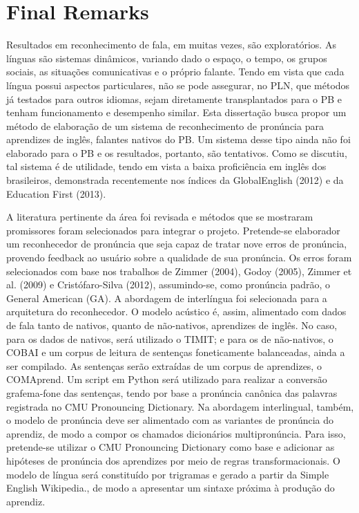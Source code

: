 \chapter{Final Remarks}\label{ch:final-remarks}


Resultados em reconhecimento de fala, em muitas vezes, s\~ao
explorat\'orios. As l\'inguas s\~ao sistemas din\^amicos, variando dado o
espa\c{c}o, o tempo, os grupos sociais, as situa\c{c}\~oes comunicativas e o
pr\'oprio falante. Tendo em vista que cada l\'ingua possui aspectos
particulares, n\~ao se pode assegurar, no PLN, que m\'etodos j\'a testados
para outros idiomas, sejam diretamente transplantados para o PB e tenham
funcionamento e desempenho similar. Esta disserta\c{c}\~ao busca propor um
m\'etodo de elabora\c{c}\~ao de um sistema de reconhecimento de pron\'uncia para
aprendizes de ingl\^es, falantes nativos do PB. Um sistema desse tipo
ainda n\~ao foi elaborado para o PB e os resultados, portanto, s\~ao
tentativos. Como se discutiu, tal sistema \'e de utilidade, tendo em vista
a baixa profici\^encia em ingl\^es dos brasileiros, demonstrada recentemente
nos \'indices da GlobalEnglish (2012) e da Education First (2013).

A literatura pertinente da \'area foi revisada e m\'etodos que se mostraram
promissores foram selecionados para integrar o projeto. Pretende-se
elaborador um reconhecedor de pron\'uncia que seja capaz de tratar nove
erros de pron\'uncia, provendo feedback ao usu\'ario sobre a qualidade de
sua pron\'uncia. Os erros foram selecionados com base nos trabalhos de
Zimmer (2004), Godoy (2005), Zimmer et al. (2009) e Crist\'ofaro-Silva
(2012), assumindo-se, como pron\'uncia padr\~ao, o General American (GA). A
abordagem de interl\'ingua foi selecionada para a arquitetura do
reconhecedor. O modelo ac\'ustico \'e, assim, alimentado com dados de fala
tanto de nativos, quanto de n\~ao-nativos, aprendizes de ingl\^es. No caso,
para os dados de nativos, ser\'a utilizado o TIMIT; e para os de
n\~ao-nativos, o COBAI e um corpus de leitura de senten\c{c}as foneticamente
balanceadas, ainda a ser compilado. As senten\c{c}as ser\~ao extra\'idas de um
corpus de aprendizes, o COMAprend. Um script em Python ser\'a utilizado
para realizar a convers\~ao grafema-fone das senten\c{c}as, tendo por base a
pron\'uncia can\^onica das palavras registrada no CMU Pronouncing
Dictionary. Na abordagem interlingual, tamb\'em, o modelo de pron\'uncia
deve ser alimentado com as variantes de pron\'uncia do aprendiz, de modo a
compor os chamados dicion\'arios multipron\'uncia. Para isso, pretende-se
utilizar o CMU Pronouncing Dictionary como base e adicionar as hip\'oteses
de pron\'uncia dos aprendizes por meio de regras transformacionais. O
modelo de l\'ingua ser\'a constitu\'ido por trigramas e gerado a partir da
Simple English Wikipedia., de modo a apresentar um sintaxe pr\'oxima à
produ\c{c}\~ao do aprendiz.


